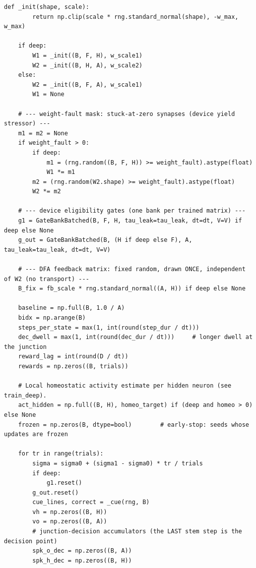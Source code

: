 \begin{lstlisting}[caption={mrl\_trace/deep\_sequential.py},label={lst:siox-src-deep_sequential}]
    def _init(shape, scale):
        return np.clip(scale * rng.standard_normal(shape), -w_max, w_max)

    if deep:
        W1 = _init((B, F, H), w_scale1)
        W2 = _init((B, H, A), w_scale2)
    else:
        W2 = _init((B, F, A), w_scale1)
        W1 = None

    # --- weight-fault mask: stuck-at-zero synapses (device yield stressor) ---
    m1 = m2 = None
    if weight_fault > 0:
        if deep:
            m1 = (rng.random((B, F, H)) >= weight_fault).astype(float)
            W1 *= m1
        m2 = (rng.random(W2.shape) >= weight_fault).astype(float)
        W2 *= m2

    # --- device eligibility gates (one bank per trained matrix) ---
    g1 = GateBankBatched(B, F, H, tau_leak=tau_leak, dt=dt, V=V) if deep else None
    g_out = GateBankBatched(B, (H if deep else F), A, tau_leak=tau_leak, dt=dt, V=V)

    # --- DFA feedback matrix: fixed random, drawn ONCE, independent of W2 (no transport) ---
    B_fix = fb_scale * rng.standard_normal((A, H)) if deep else None

    baseline = np.full(B, 1.0 / A)
    bidx = np.arange(B)
    steps_per_state = max(1, int(round(step_dur / dt)))
    dec_dwell = max(1, int(round(dec_dur / dt)))     # longer dwell at the junction
    reward_lag = int(round(D / dt))
    rewards = np.zeros((B, trials))

    # Local homeostatic activity estimate per hidden neuron (see train_deep).
    act_hidden = np.full((B, H), homeo_target) if (deep and homeo > 0) else None
    frozen = np.zeros(B, dtype=bool)        # early-stop: seeds whose updates are frozen

    for tr in range(trials):
        sigma = sigma0 + (sigma1 - sigma0) * tr / trials
        if deep:
            g1.reset()
        g_out.reset()
        cue_lines, correct = _cue(rng, B)
        vh = np.zeros((B, H))
        vo = np.zeros((B, A))
        # junction-decision accumulators (the LAST stem step is the decision point)
        spk_o_dec = np.zeros((B, A))
        spk_h_dec = np.zeros((B, H))


\end{lstlisting}
